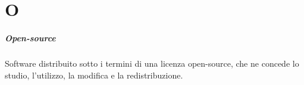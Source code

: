 \chapter{O}

\paragraph*{Open-source}
Software distribuito sotto i termini di una licenza open-source, che ne concede lo studio, l'utilizzo, la modifica e la redistribuzione.